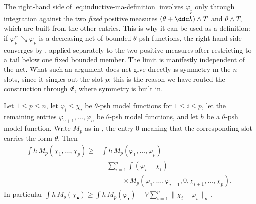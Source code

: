 \begin{remark}
\label{rem:ch24-forced-ibp-as-definition}
The right-hand side of \eqref{eq:inductive-ma-definition} involves
$\varphi_p$ only through integration against the two \emph{fixed} positive
measures $(\theta+\ddc h)\wedge T$ and $\theta\wedge T$, which are built
from the other entries.  This is why it can be used as a definition: if
$\varphi_p^\alpha\searrow\varphi_p$ is a decreasing net of bounded
$\theta$-psh functions, the right-hand side converges by
, applied separately to the two
positive measures after restricting to a tail below one fixed bounded
member.  The limit is manifestly independent of the net.  What such an
argument does not give directly is symmetry in the $n$ slots, since it
singles out the slot $p$; this is the reason we have routed the
construction through $\mathfrak E$, where symmetry is built in.
\end{remark}

\begin{proposition}
\label{prop:ch24-approximate-monotonicity}
Let $1\leq p\leq n$, let $\varphi_i\leq\chi_i$ be $\theta$-psh model
functions for $1\leq i\leq p$, let the remaining entries
$\varphi_{p+1},\ldots,\varphi_n$ be $\theta$-psh model functions, and let
$h$ be a $\theta$-psh model function.  Write $M_p$ as in
, the entry $0$ meaning that the corresponding
slot carries the form $\theta$.  Then
\begin{equation}
\label{eq:approximate-monotonicity}
\begin{split}
 \int h\,M_p(\chi_1,\ldots,\chi_p)
 \geq{}&\int h\,M_p(\varphi_1,\ldots,\varphi_p)\\
 &+\sum_{i=1}^p\int(\varphi_i-\chi_i)\\
 &\qquad\quad{}\times M_p(\varphi_1,\ldots,\varphi_{i-1},0,
           \chi_{i+1},\ldots,\chi_p).
\end{split}
\end{equation}
In particular
$\int h\,M_p(\chi_\bullet)\geq\int h\,M_p(\varphi_\bullet)
 -V\sum_{i=1}^p\|\chi_i-\varphi_i\|_\infty$.
\end{proposition}

